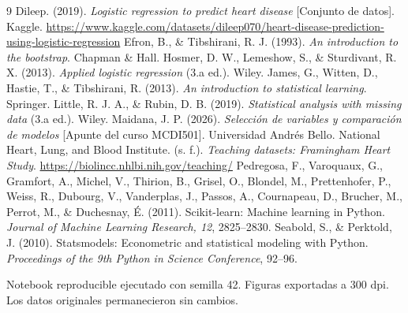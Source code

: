 \documentclass[10pt,a4paper]{article}
\begin{document}
\clearpage
\small
\begin{thebibliography}{9}
 Dileep. (2019). \textit{Logistic regression to predict heart disease} [Conjunto de datos]. Kaggle. \url{https://www.kaggle.com/datasets/dileep070/heart-disease-prediction-using-logistic-regression}
 Efron, B., \& Tibshirani, R. J. (1993). \textit{An introduction to the bootstrap}. Chapman \& Hall.
 Hosmer, D. W., Lemeshow, S., \& Sturdivant, R. X. (2013). \textit{Applied logistic regression} (3.a ed.). Wiley.
 James, G., Witten, D., Hastie, T., \& Tibshirani, R. (2013). \textit{An introduction to statistical learning}. Springer.
 Little, R. J. A., \& Rubin, D. B. (2019). \textit{Statistical analysis with missing data} (3.a ed.). Wiley.
 Maidana, J. P. (2026). \textit{Selección de variables y comparación de modelos} [Apunte del curso MCDI501]. Universidad Andrés Bello.
 National Heart, Lung, and Blood Institute. (s. f.). \textit{Teaching datasets: Framingham Heart Study}. \url{https://biolincc.nhlbi.nih.gov/teaching/}
 Pedregosa, F., Varoquaux, G., Gramfort, A., Michel, V., Thirion, B., Grisel, O., Blondel, M., Prettenhofer, P., Weiss, R., Dubourg, V., Vanderplas, J., Passos, A., Cournapeau, D., Brucher, M., Perrot, M., \& Duchesnay, É. (2011). Scikit-learn: Machine learning in Python. \textit{Journal of Machine Learning Research, 12}, 2825--2830.
 Seabold, S., \& Perktold, J. (2010). Statsmodels: Econometric and statistical modeling with Python. \textit{Proceedings of the 9th Python in Science Conference}, 92--96.
\end{thebibliography}

\vfill
\begin{center}
\footnotesize Notebook reproducible ejecutado con semilla 42. Figuras exportadas a 300 dpi. Los datos originales permanecieron sin cambios.
\end{center}
\end{document}
